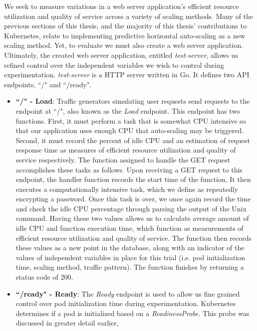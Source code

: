 We seek to measure variations in a web server application's
efficient resource utilization and quality of service across a variety of
scaling methods. Many of the previous sections of this thesis, and the majority
of this thesis' contributions to Kubernetes, relate to implementing predictive
horizontal auto-scaling as a new scaling method. Yet, to evaluate we must also
create a web server application. Ultimately, the created web server application,
entitled \textit{test-server}, allows us refined control over the independent
variables we wish to control during experimentation. \textit{test-server}
is a HTTP server written in Go. It defines two API
endpoints, ``/" and ``/ready".

\begin{itemize}
  \item \textbf{``/" - Load}: Traffic generators simulating user requests
    send  requests to the endpoint at ``/", also known as the \textit{Load} endpoint.
    This endpoint has two functions. First, it must perform a task that is
    somewhat CPU intensive so that our application uses enough CPU that
    auto-scaling may be triggered. Second, it must record the percent of idle CPU
    and an estimation of request response time as measures of
    efficient resource utilization and quality of service respectively. The
    function assigned to handle the GET request accomplishes these tasks as
    follows. Upon receiving a GET request to this endpoint, the handler function
    records the start time of the function. It then executes a computationally intensive
    task, which we define as repeatedly encrypting a password. Once this task
    is over, we once again record the time and check the idle CPU percentage
    through parsing the output of the  Unix command.
    Having these two values allows us to calculate average amount of idle CPU
    and function execution time, which function as measurements of
    efficient resource utilization and quality of service. The function then
    records these values as a new point in the database, along with
    an indicator of the values of independent variables in place for this trial
    (i.e. pod initialization time, scaling method, traffic pattern). The function finishes by
    returning a status code of 200.
  \item \textbf{``/ready" - Ready}: The \textit{Ready} endpoint is used to allow
    us fine grained control over pod initialization time during experimentation.
    Kubernetes determines if a pod is initialized based on a
    \textit{ReadinessProbe}. This probe was discussed in greater detail earlier,

\end{itemize}
